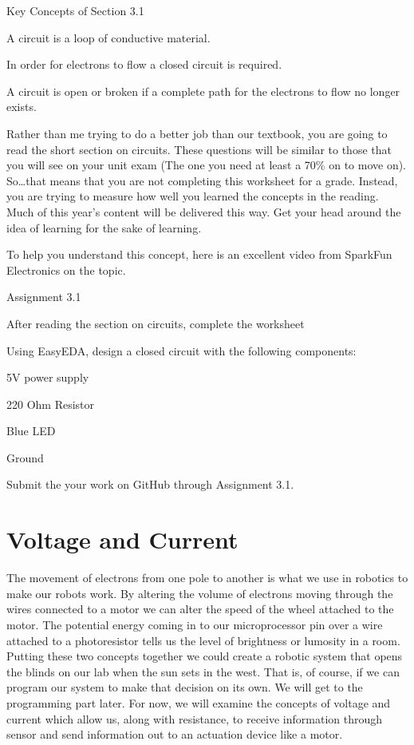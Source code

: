 \documentclass[
]{book}
\begin{document}
Key Concepts of Section 3.1

A circuit is a loop of conductive material.

In order for electrons to flow a closed circuit is required.

A circuit is open or broken if a complete path for the electrons to flow no longer exists.

Rather than me trying to do a better job than our textbook, you are going to read the short section on circuits. These questions will be similar to those that you will see on your unit exam (The one you need at least a 70\% on to move on). So\ldots that means that you are not completing this worksheet for a grade. Instead, you are trying to measure how well you learned the concepts in the reading. Much of this year's content will be delivered this way. Get your head around the idea of learning for the sake of learning.

To help you understand this concept, here is an excellent video from SparkFun Electronics on the topic.

Assignment 3.1

After reading the section on circuits, complete the worksheet

Using EasyEDA, design a closed circuit with the following components:

5V power supply

220 Ohm Resistor

Blue LED

Ground

Submit the your work on GitHub through Assignment 3.1.

\hypertarget{voltage-and-current}{%
\section{Voltage and Current}\label{voltage-and-current}}

The movement of electrons from one pole to another is what we use in robotics to make our robots work. By altering the volume of electrons moving through the wires connected to a motor we can alter the speed of the wheel attached to the motor. The potential energy coming in to our microprocessor pin over a wire attached to a photoresistor tells us the level of brightness or lumosity in a room. Putting these two concepts together we could create a robotic system that opens the blinds on our lab when the sun sets in the west. That is, of course, if we can program our system to make that decision on its own. We will get to the programming part later. For now, we will examine the concepts of voltage and current which allow us, along with resistance, to receive information through sensor and send information out to an actuation device like a motor.
\end{document}
